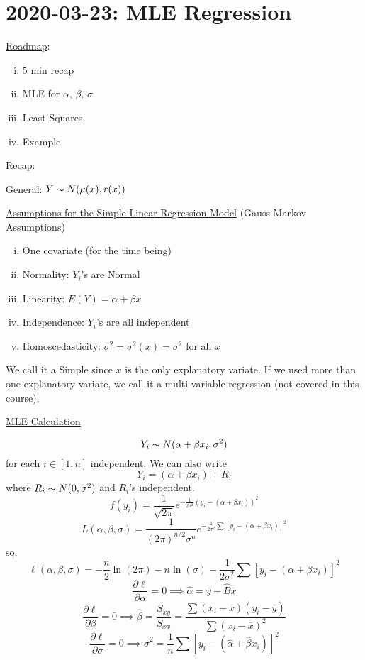 \section{2020-03-23: MLE Regression}
\underline{Roadmap}:
\begin{enumerate}[(i)]
    \item $ 5 $ min recap
    \item MLE for $ \alpha,\,\beta,\,\sigma $
    \item Least Squares
    \item Example
\end{enumerate}

\underline{Recap}:

General: $ Y \thicksim N(\mu(x),r(x)) $

\underline{Assumptions for the Simple Linear Regression Model}
(Gauss Markov Assumptions)
\begin{enumerate}[(i)]
    \item One covariate (for the time being)
    \item Normality: $ Y_i $'s are Normal
    \item Linearity: $ E(Y)=\alpha+\beta x $
    \item Independence: $ Y_i $'s are all independent
    \item Homoscedasticity: $ \sigma^2=\sigma^2(x)=\sigma^2 $ for all $ x $
\end{enumerate}
We call it a Simple since $ x $ is the only
explanatory variate. If we used more than one explanatory variate,
we call it a multi-variable regression (not covered in this course).

\underline{MLE Calculation}

\[ Y_i \thicksim N(\alpha+\beta x_i, \sigma^2) \]
for each $ i\in[1,n] $
independent. We can also write
\[ Y_i=(\alpha+\beta x_i)+R_i \]
where $ R_i \thicksim N(0,\sigma^2) $ and $ R_i $'s independent.
\[ f(y_i)=\frac{1}{\sqrt{2 \pi}}e^{-\frac{1}{2\sigma^2}(y_i-(\alpha+\beta x_i))^2}  \]
\[
    L(\alpha, \beta, \sigma)=
    \frac{1}{(2 \pi)^{n / 2} \sigma^{n}}
    e^{-\frac{1}{2 \sigma^{2}}
            \sum\left[y_{i}-\left(\alpha+\beta x_i\right)\right]^{2}}
\]
so,
\[ \ell(\alpha,\beta,\sigma)=-\frac{n}{2} \ln(2\pi)-n\ln(\sigma)-
    \frac{1}{2\sigma^2}\sum\left[y_{i}-\left(\alpha+\beta x_i\right)\right]^{2}  \]
\[ \frac{\partial\ell}{\partial\alpha}=0\implies
    \hat{\alpha}=\overline{y}-\hat{B}\overline{x} \]
\[ \frac{\partial \ell}{\partial \beta}=0\implies
    \hat{\beta}=\frac{S_{xy}}{S_{xx}}=\frac{\sum(x_i-\overline{x})(y_i-\overline{y})}
    {\sum (x_i-\overline{x})^2}  \]
\[ \frac{\partial\ell}{\partial \sigma}=0\implies
    \hat{\sigma}^2=\frac{1}{n} \sum \left[ y_i-(\hat{\alpha}+\hat{\beta}x_i) \right]^2 \]

